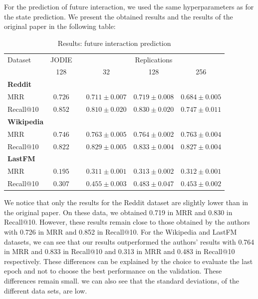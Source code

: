 For the prediction of future interaction, we used the same hyperparameters as for the state prediction. We present the obtained results and the results of the original paper in the following table:

\begin{table}[H]
    \centering
    \begin{tabular}{@{}lccccc@{}}
    \toprule
    Dataset\hspace*{3em} & JODIE & \phantom{abc} & \multicolumn{3}{c}{Replications} \\
    \cmidrule{2-2} \cmidrule{4-6}
    & 128 && \multicolumn{1}{c}{32} & \multicolumn{1}{c}{128} & \multicolumn{1}{c}{256} \\
    \midrule
    \multicolumn{1}{l}{\hspace{-0.2cm}\textbf{Reddit}} \\
    {\quad \small MRR} & $\boldsymbol{0.726}$  && $0.711 \pm 0.007$ & $0.719 \pm 0.008$ & $0.684 \pm 0.005$ \\
    {\quad\small Recall@10}  &$\boldsymbol{0.852}$ && $0.810 \pm 0.020$ & $0.830 \pm 0.020$ & $0.747 \pm 0.011$\\
    \multicolumn{1}{l}{\hspace{-0.2cm}\textbf{Wikipedia}}\\
    {\quad\small MRR} &$0.746$ && $\boldsymbol{0.763} \pm 0.005$ & $\boldsymbol{0.764} \pm 0.002$ & $\boldsymbol{0.763} \pm 0.004$  \\
    {\quad\small Recall@10}  & $0.822$ && $\boldsymbol{0.829} \pm 0.005$ & $\boldsymbol{0.833} \pm 0.004$ & $\boldsymbol{0.827} \pm 0.004$\\
    \multicolumn{1}{l}{\hspace{-0.2cm}\textbf{LastFM}} \\
    {\quad\small MRR} &$0.195$ && $\boldsymbol{0.311} \pm 0.001$ & $\boldsymbol{0.313} \pm 0.002$ & $\boldsymbol{0.312} \pm 0.001$ \\
    {\quad\small Recall@10}  & $0.307$ && $\boldsymbol{0.455} \pm 0.003$ & $\boldsymbol{0.483} \pm 0.047$ & $\boldsymbol{0.453} \pm 0.002$\\
    \bottomrule
    \end{tabular}
    \caption{Results: future interaction prediction}
\end{table}

We notice that only the results for the Reddit dataset are slightly lower than in the original paper. On these data, we obtained 0.719 in MRR and 0.830 in Recall@10. However, these results remain close to those obtained by the authors with 0.726 in MRR and 0.852 in Recall@10. For the Wikipedia and LastFM datasets, we can see that our results outperformed the authors' results with 0.764 in MRR and 0.833 in Recall@10 and 0.313 in MRR and 0.483 in Recall@10 respectively. These differences can be explained by the choice to evaluate the last epoch and not to choose the best performance on the validation. These differences remain small. we can also see that the standard deviations, of the different data sets, are low.\\

